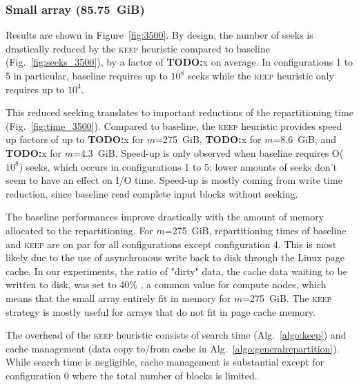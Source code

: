 \documentclass[sigconf, nonacm]{acmart}
\newcommand{\todo}[1]{\color{red}\textbf{TODO:}#1\color{black}}
\newcommand{\keep}[0]{\textsc{keep}\xspace}
\begin{document}
\subsubsection{Small array (85.75~GiB)}

Results are shown in Figure~\ref{fig:3500}.
By design, the number of seeks is drastically reduced by the \keep
heuristic compared to baseline (Fig.~\ref{fig:seeks_3500}), by a factor of
\todo{x} on average. In configurations 1 to 5 in particular, baseline
requires up to $10^8$ seeks while the \keep heuristic only requires up to
$10^4$.

This reduced seeking translates to important reductions of the
repartitioning time (Fig.~\ref{fig:time_3500}). Compared to baseline, the
\keep heuristic provides speed up factors of up to \todo{x} for
$m$=275~GiB, \todo{x} for $m$=8.6~GiB, and \todo{x} for $m$=4.3~GiB.
Speed-up is only observed when baseline requires O($10^8$) seeks, which occurs
in configurations 1 to 5: lower amounts of seeks don't seem to have an effect on
I/O time. Speed-up is mostly coming from write time reduction, since
baseline read complete input blocks without seeking.



The baseline performances improve drastically with the amount of memory
allocated to the repartitioning. For $m$=275~GiB, repartitioning times of
baseline and \keep are on par for all configurations except configuration
4. This is most likely due to the use of asynchronous write back to disk
through the Linux page cache. In our experiments, the ratio of "dirty"
data, the cache data waiting to be written to disk, was set to 40\% , a
common value for compute nodes, which means that the small array entirely
fit in memory for $m$=275~GiB. The \keep strategy is mostly useful for
arrays that do not fit in page cache memory.

The overhead of the \keep heuristic consists of search time
(Alg.~\ref{algo:keep}) and cache management (data copy to/from cache in
Alg.~\ref{algo:generalrepartition}). While search time is negligible, cache
management is substantial except for configuration 0 where the total number
of blocks is limited.
\end{document}
